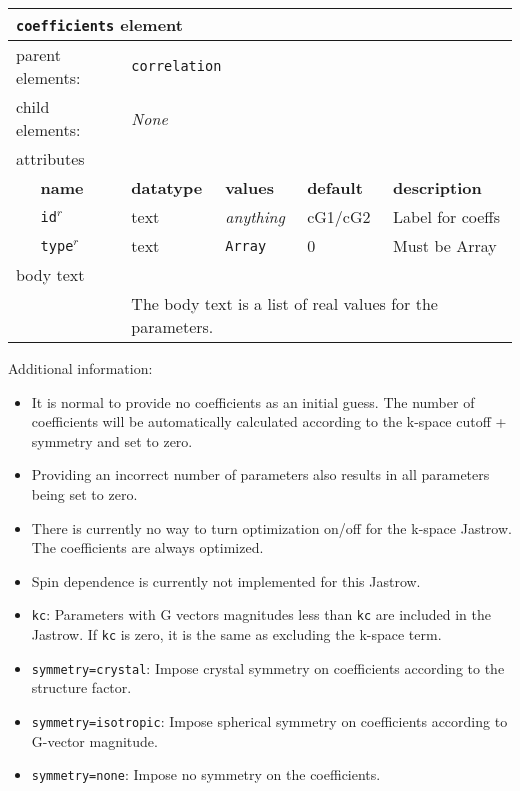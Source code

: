 \FloatBarrier
\begin{table}[h]
\begin{center}
\begin{tabularx}{\textwidth}{l l l l l l }
\hline
\multicolumn{6}{l}{\texttt{coefficients} element} \\
\hline
\multicolumn{2}{l}{parent elements:} & \multicolumn{4}{l}{\texttt{correlation}}\\
\multicolumn{2}{l}{child  elements:} & \multicolumn{4}{l}{\textit{None}}\\
\multicolumn{2}{l}{attributes}  & \multicolumn{4}{l}{}\\
   &   \bfseries name     & \bfseries datatype & \bfseries values  & \bfseries default   & \bfseries description \\
   & \texttt{id}$^r$      &  text              & \textit{anything} &     cG1/cG2         & Label for coeffs     \\
   & \texttt{type}$^r$    &  text              & \texttt{Array}    &   0                 & Must be Array \\
\multicolumn{2}{l}{body text}  & \multicolumn{4}{l}{}\\
   &                           & \multicolumn{4}{l}{The body text is a list of real values for the parameters.}     \\
  \hline
\end{tabularx}
\end{center}
\end{table}
\FloatBarrier


Additional information:
\begin{itemize}
  \item{It is normal to provide no coefficients as an initial guess.  The number of coefficients will be automatically calculated according to the k-space cutoff + symmetry and set to zero. }
  \item{Providing an incorrect number of parameters also results in all parameters being set to zero.}
  \item{There is currently no way to turn optimization on/off for the k-space Jastrow.  The coefficients are always optimized.}
  \item{Spin dependence is currently not implemented for this Jastrow.}
  \item{\texttt{kc}: Parameters with G vectors magnitudes less than \texttt{kc} are included in the Jastrow.  If \texttt{kc} is zero, it is the same as excluding the k-space term.}
  \item{\texttt{symmetry=crystal}: Impose crystal symmetry on coefficients according to the structure factor.}
  \item{\texttt{symmetry=isotropic}: Impose spherical symmetry on coefficients according to G-vector magnitude.}
  \item{\texttt{symmetry=none}: Impose no symmetry on the coefficients.}
\end{itemize}


